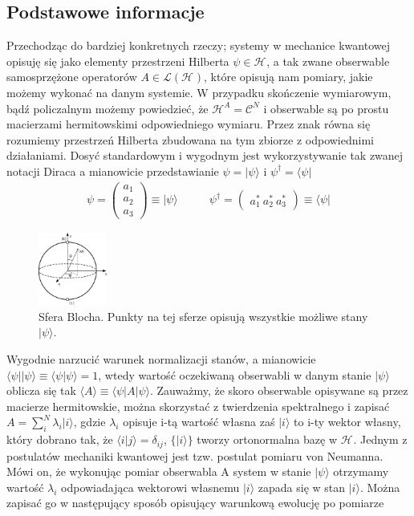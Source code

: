 \documentclass[10pt]{article} %
\newcommand{\Mats}[1]{\mathcal{L}(#1)}
\newcommand{\Hx}[1]{\mathcal{H}^{#1}}
\newcommand{\LHx}[1]{\Mats{\Hx{#1}}}
\newcommand{\Ket}[1]{|#1\rangle}
\newcommand{\Bra}[1]{\langle#1|}
\newcommand{\Braket}[1]{\langle#1\rangle}
\newcommand{\KP}{\Ket{\psi}}
\begin{document}
\subsection{Podstawowe informacje}
Przechodząc do bardziej konkretnych rzeczy; systemy w mechanice kwantowej opisuję się jako elementy przestrzeni Hilberta $\psi \in \Hx{}$, a tak zwane obserwable samosprzężone operatorów $A \in \LHx{}$, które opisują nam pomiary, jakie możemy wykonać na danym systemie. W przypadku skończenie wymiarowym, bądź policzalnym możemy powiedzieć, że $\Hx{A} = \mathcal{C}^N$ i
obserwable są po prostu macierzami hermitowskimi odpowiedniego wymiaru. Przez znak równa się rozumiemy przestrzeń Hilberta zbudowana na tym zbiorze z odpowiednimi działaniami. Dosyć standardowym i wygodnym jest wykorzystywanie tak zwanej notacji Diraca a mianowicie przedstawianie $\psi = \Ket{\psi}$ i $\psi^\dag = \Bra{\psi}$
\begin{align}
\psi = 
\begin{pmatrix}
a_1\\a_2\\a_3
\end{pmatrix}
\equiv \Ket{\psi}
\quad & \quad\psi^\dag = 
\begin{pmatrix}
a_1^*~a_2^*~a_3^*
\end{pmatrix}
\equiv \Bra{\psi}
\end{align}
\begin{figure}[th]
\centering
\includegraphics[width=0.20\textwidth]{obrazki/Bloch_sphere}
\caption{Sfera Blocha. Punkty na tej sferze opisują wszystkie możliwe stany $\KP$.}
\label{fig:bloch}
\end{figure}
Wygodnie narzucić warunek normalizacji stanów, a mianowicie $\Bra{\psi}\Ket{\psi} \equiv \Braket{\psi|\psi} = 1$, wtedy wartość oczekiwaną obserwabli w danym stanie $\Ket{\psi}$ oblicza się tak $\Braket{A} \equiv \Bra{\psi}A\Ket{\psi}$. Zauważmy, że skoro obserwable opisywane są przez macierze hermitowskie, można 
skorzystać z twierdzenia spektralnego i zapisać $A = \sum_i^N \lambda_i \Ket{i}$, gdzie $\lambda_i$ opisuje i-tą wartość własna zaś $\Ket{i}$ to i-ty wektor własny, który dobrano tak, że $\Braket{i|j} = \delta_{ij}$, $\{\Ket{i}\}$ tworzy ortonormalna bazę w $\Hx{}$. Jednym z postulatów mechaniki kwantowej jest tzw. postulat pomiaru von Neumanna. Mówi on, że wykonując pomiar obserwabla A system w stanie $\Ket{\psi}$ otrzymamy wartość $\lambda_i$ odpowiadająca wektorowi własnemu $\Ket{i}$ zapada się w stan $\Ket{i}$. Można zapisać go w następujący sposób opisujący warunkową ewolucję po pomiarze
\end{document}
